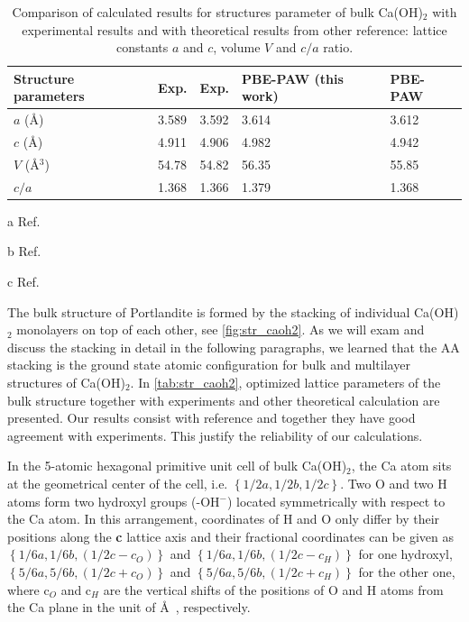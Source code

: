 \begin{table}
\centering
\caption{\label{tab:str_caoh2}
Comparison of calculated results for structures parameter of bulk Ca(OH)$_2$ with experimental results and with theoretical results from other reference: lattice constants 
$a$ and $c$, volume $V$ and $c/a$ ratio. }
\begin{threeparttable}
\begin{tabularx}{\linewidth}{lXXXX}
\hline\hline
Structure parameters & Exp. \tnote{a} & Exp. \tnote{b} & PBE-PAW (this work) & PBE-PAW \tnote{c}  \\
\hline

$a$ (\AA)                   & 3.589 & 3.592 & 3.614 & 3.612 \\
$c$ (\AA)                   & 4.911 & 4.906 & 4.982 & 4.942 \\
$V$ (\AA$^3$)               & 54.78 & 54.82 & 56.35 & 55.85 \\
$c/a$                       & 1.368 & 1.366 & 1.379 & 1.368 \\

\hline\hline

\end{tabularx}
\begin{tablenotes}
\item[a]Ref. \cite{exp.1}
\item[b]Ref. \cite{exp.2}
\item[c]Ref. \cite{Pishtshev}
\end{tablenotes}
\end{threeparttable}
\end{table}

The bulk structure of Portlandite is formed by the stacking of individual Ca(OH)$_2$ monolayers on top of each other, see \autoref{fig:str_caoh2}. As we will exam and discuss the stacking in detail in the following paragraphs, we learned that the AA stacking is the ground state atomic configuration for bulk and multilayer structures of Ca(OH)$_2$. In \autoref{tab:str_caoh2}, optimized lattice parameters of the bulk structure together with experiments and other theoretical calculation are presented. Our results consist with reference \cite{Pishtshev} and together they have good agreement with experiments. This justify the reliability of our calculations. 





In the 5-atomic hexagonal primitive unit cell of bulk Ca(OH)$_2$, the Ca atom sits at the geometrical
center of the cell, i.e. $\left\lbrace 1/2a, 1/2b,
1/2c \right\rbrace$. Two O and two H atoms form two hydroxyl groups 
(-OH$^-$) located symmetrically with respect to the Ca atom. In this 
arrangement, coordinates of H and O only differ by their positions along the 
\textbf{c} lattice axis and their fractional coordinates can be given as
$\left\lbrace1/6a, 1/6b, (1/2c-c_O) \right\rbrace$ and $\left\lbrace 
1/6a, 1/6b, (1/2c-c_H) \right\rbrace$ for one hydroxyl,
$\left\lbrace 5/6a, 5/6b, (1/2c+c_O) \right\rbrace$
and $\left\lbrace 5/6a, 5/6b, (1/2c+c_H)
\right\rbrace$ for the other one, where c$_O$ and c$_H$ are the vertical shifts
of the positions of O and H atoms from the Ca plane in the unit of \AA~, respectively. 


